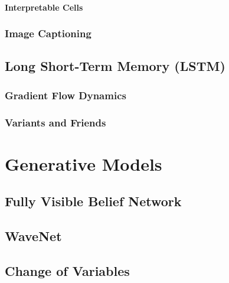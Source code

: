 			\subsubsection{Interpretable Cells} %

		\subsection{Image Captioning} %

	\section{Long Short-Term Memory (LSTM)} %

		\subsection{Gradient Flow Dynamics} %

		\subsection{Variants and Friends} %

\chapter{Generative Models} %

	\section{Fully Visible Belief Network} %

	\section{WaveNet} %

	\section{Change of Variables} %

